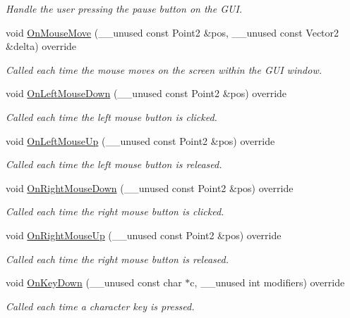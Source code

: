 \begin{DoxyCompactItemize}
\begin{DoxyCompactList}\small\item\em Handle the user pressing the pause button on the G\+UI. \end{DoxyCompactList}\item 
void \hyperlink{classRobotViewer_ae3b11d89a8f596d43bd7127ed7cfccf5}{On\+Mouse\+Move} (\+\_\+\+\_\+unused const Point2 \&pos, \+\_\+\+\_\+unused const Vector2 \&delta) override
\begin{DoxyCompactList}\small\item\em Called each time the mouse moves on the screen within the G\+UI window. \end{DoxyCompactList}\item 
void \hyperlink{classRobotViewer_a51776dc0f3c06be3e459e2669a7bd3ff}{On\+Left\+Mouse\+Down} (\+\_\+\+\_\+unused const Point2 \&pos) override
\begin{DoxyCompactList}\small\item\em Called each time the left mouse button is clicked. \end{DoxyCompactList}\item 
void \hyperlink{classRobotViewer_a4b9372334e89152c2f8daf2cc2687943}{On\+Left\+Mouse\+Up} (\+\_\+\+\_\+unused const Point2 \&pos) override
\begin{DoxyCompactList}\small\item\em Called each time the left mouse button is released. \end{DoxyCompactList}\item 
void \hyperlink{classRobotViewer_ab5420b89be50106eefcbc44dece71e74}{On\+Right\+Mouse\+Down} (\+\_\+\+\_\+unused const Point2 \&pos) override
\begin{DoxyCompactList}\small\item\em Called each time the right mouse button is clicked. \end{DoxyCompactList}\item 
void \hyperlink{classRobotViewer_afe613a2bd8c13810327cf5344dac1a5e}{On\+Right\+Mouse\+Up} (\+\_\+\+\_\+unused const Point2 \&pos) override
\begin{DoxyCompactList}\small\item\em Called each time the right mouse button is released. \end{DoxyCompactList}\item 
void \hyperlink{classRobotViewer_a5a5e4be05ae7a8b3d137a3388638ad63}{On\+Key\+Down} (\+\_\+\+\_\+unused const char $\ast$c, \+\_\+\+\_\+unused int modifiers) override
\begin{DoxyCompactList}\small\item\em Called each time a character key is pressed. \end{DoxyCompactList}\item 

\end{DoxyCompactItemize}
